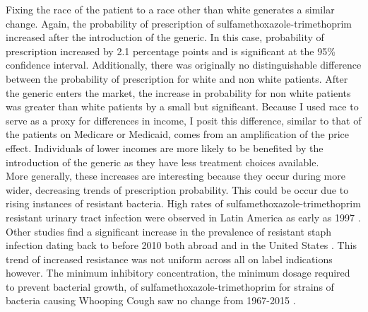 \indent Fixing the race of the patient to a race other than white generates a similar change. Again, the probability of prescription of sulfamethoxazole-trimethoprim increased after the introduction of the generic. In this case, probability of prescription increased by 2.1 percentage points and is significant at the 95\% confidence interval. Additionally, there was originally no distinguishable difference between the probability of prescription for white and non white patients. After the generic enters the market, the increase in probability for non white patients was greater than white patients by a small but significant. Because I used race to serve as a proxy for differences in income, I posit this difference, similar to that of the patients on Medicare or Medicaid, comes from an amplification of the price effect. Individuals of lower incomes are more likely to be benefited by the introduction of the generic as they have less treatment choices available.\\
\indent More generally, these increases are interesting because they occur during more wider, decreasing trends of prescription probability. This could be occur due to rising instances of resistant bacteria. High rates of sulfamethoxazole-trimethoprim resistant urinary tract infection were observed in Latin America as early as 1997 \cite{gales_urinary_2002}. Other studies find a significant increase in the prevalence of resistant staph infection dating back to before 2010 both abroad \cite{noauthor_resistance_nodate} and in the United States \cite{khamash_increasing_2019}. This trend of increased resistance was not uniform across all on label indications however. The minimum inhibitory concentration, the minimum dosage required to prevent bacterial growth, of sulfamethoxazole-trimethoprim for strains of bacteria causing Whooping Cough saw no change from 1967-2015 \cite{jakubu_trends_2017}.

